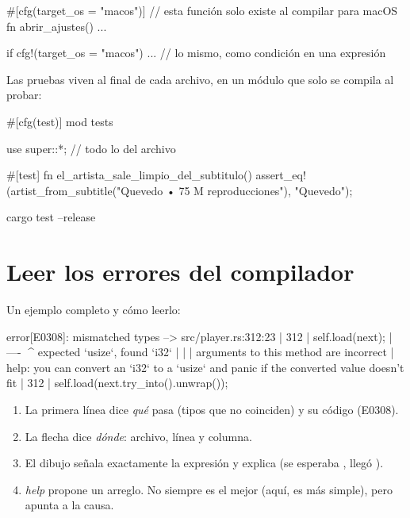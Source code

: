 \begin{rust}
#[cfg(target_os = "macos")]          // esta función solo existe al compilar para macOS
fn abrir_ajustes() { ... }

if cfg!(target_os = "macos") { ... } // lo mismo, como condición en una expresión
\end{rust}

Las pruebas viven al final de cada archivo, en un módulo que solo se compila al probar:

\begin{rust}
#[cfg(test)]
mod tests {
    use super::*;                     // todo lo del archivo

    #[test]
    fn el_artista_sale_limpio_del_subtitulo() {
        assert_eq!(artist_from_subtitle("Quevedo • 75 M reproducciones"), "Quevedo");
    }
}
\end{rust}

\begin{terminal}
cargo test --release
\end{terminal}

\section{Leer los errores del compilador}

Un ejemplo completo y cómo leerlo:

\begin{terminal}
error[E0308]: mismatched types
  --> src/player.rs:312:23
   |
312 |         self.load(next);
   |              ---- ^^^^ expected `usize`, found `i32`
   |              |
   |              arguments to this method are incorrect
   |
help: you can convert an `i32` to a `usize` and panic if the converted value doesn't fit
   |
312 |         self.load(next.try_into().unwrap());
\end{terminal}

\begin{enumerate}
  \item La primera línea dice \emph{qué} pasa (tipos que no coinciden) y su código (E0308).
  \item La flecha dice \emph{dónde}: archivo, línea y columna.
  \item El dibujo señala exactamente la expresión y explica (se esperaba , llegó
  ).
  \item \emph{help} propone un arreglo. No siempre es el mejor (aquí,  es
  más simple), pero apunta a la causa.
\end{enumerate}

